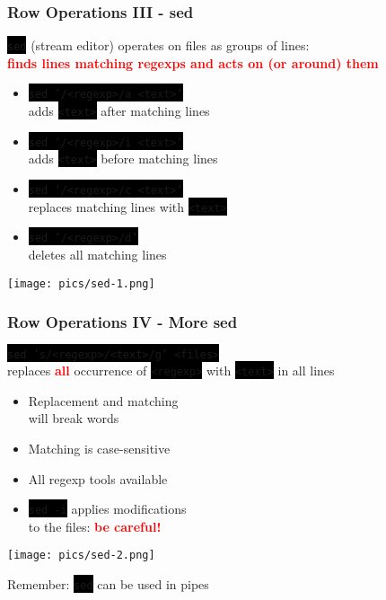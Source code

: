 \documentclass[unknownkeysallowed, 10pt, a4 paper, handout]{beamer}
\newcommand{\focus}[1]{\textbf{\textcolor{red}{#1}}}
\newcommand{\code}[1]{\colorbox{black}{\color{green}\texttt{#1}}}
\newcommand{\sidebyside}[5]{
  \begin{minipage}{#1\textwidth}
    #2
  \end{minipage} #3 \begin{minipage}{#4\textwidth}
    #5
  \end{minipage}
}
\begin{document}
\begin{frame}
  \begin{center}
    \frametitle{Row Operations III - sed}

    \code{sed} (stream editor) operates on files as groups of lines:\\
    \focus{finds lines matching regexps and acts on (or around) them}

    \sidebyside{0.60}{
      \begin{itemize}
        \item \code{sed '/<regexp>/a <text>'}\\
          adds \code{<text>} after matching lines
        \item \code{sed '/<regexp>/i <text>'}\\
          adds \code{<text>} before matching lines
        \item \code{sed '/<regexp>/c <text>'}\\
          replaces matching lines with \code{<text>}
        \item \code{sed '/<regexp>/d'}\\
          deletes all matching lines
      \end{itemize}
    }{\hfill}{0.38}{
      \begin{center}
        \texttt{[image: pics/sed-1.png]}
      \end{center}
    }
  \end{center}
\end{frame}

\begin{frame}
  \begin{center}
    \frametitle{Row Operations IV - More sed}

     \code{sed 's/<regexp>/<text>/g' <files>}\\
     replaces \focus{all} occurrence of \code{<regexp>} with \code{<text>} in all lines

     \vspace{3mm}

     \sidebyside{0.54}{
       \begin{itemize}
         \item Replacement and matching\\
           will break words
         \item Matching is case-sensitive
         \item All regexp tools available
         \item \code{sed -i} applies modifications\\
           to the files: \focus{be careful!}
       \end{itemize}
     }{\hfill}{0.43}{
       \begin{center}
         \texttt{[image: pics/sed-2.png]}
       \end{center}
     }

     \vspace{3mm}

     Remember: \code{sed} can be used in pipes
  \end{center}
\end{frame}
\end{document}
